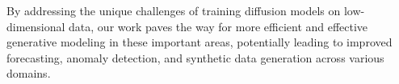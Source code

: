 \documentclass{article} %
\begin{document}
By addressing the unique challenges of training diffusion models on low-dimensional data, our work paves the way for more efficient and effective generative modeling in these important areas, potentially leading to improved forecasting, anomaly detection, and synthetic data generation across various domains.



\end{document}
